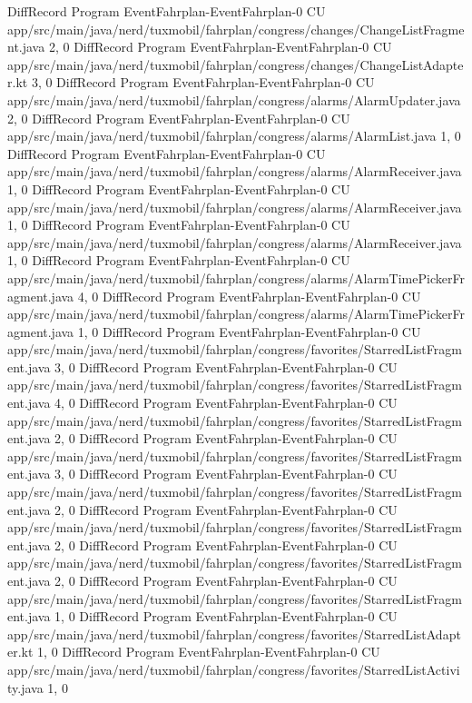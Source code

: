 DiffRecord Program EventFahrplan-EventFahrplan-0 CU app/src/main/java/nerd/tuxmobil/fahrplan/congress/changes/ChangeListFragment.java  {2, 0}
DiffRecord Program EventFahrplan-EventFahrplan-0 CU app/src/main/java/nerd/tuxmobil/fahrplan/congress/changes/ChangeListAdapter.kt  {3, 0}
DiffRecord Program EventFahrplan-EventFahrplan-0 CU app/src/main/java/nerd/tuxmobil/fahrplan/congress/alarms/AlarmUpdater.java  {2, 0}
DiffRecord Program EventFahrplan-EventFahrplan-0 CU app/src/main/java/nerd/tuxmobil/fahrplan/congress/alarms/AlarmList.java  {1, 0}
DiffRecord Program EventFahrplan-EventFahrplan-0 CU app/src/main/java/nerd/tuxmobil/fahrplan/congress/alarms/AlarmReceiver.java  {1, 0}
DiffRecord Program EventFahrplan-EventFahrplan-0 CU app/src/main/java/nerd/tuxmobil/fahrplan/congress/alarms/AlarmReceiver.java  {1, 0}
DiffRecord Program EventFahrplan-EventFahrplan-0 CU app/src/main/java/nerd/tuxmobil/fahrplan/congress/alarms/AlarmReceiver.java  {1, 0}
DiffRecord Program EventFahrplan-EventFahrplan-0 CU app/src/main/java/nerd/tuxmobil/fahrplan/congress/alarms/AlarmTimePickerFragment.java  {4, 0}
DiffRecord Program EventFahrplan-EventFahrplan-0 CU app/src/main/java/nerd/tuxmobil/fahrplan/congress/alarms/AlarmTimePickerFragment.java  {1, 0}
DiffRecord Program EventFahrplan-EventFahrplan-0 CU app/src/main/java/nerd/tuxmobil/fahrplan/congress/favorites/StarredListFragment.java  {3, 0}
DiffRecord Program EventFahrplan-EventFahrplan-0 CU app/src/main/java/nerd/tuxmobil/fahrplan/congress/favorites/StarredListFragment.java  {4, 0}
DiffRecord Program EventFahrplan-EventFahrplan-0 CU app/src/main/java/nerd/tuxmobil/fahrplan/congress/favorites/StarredListFragment.java  {2, 0}
DiffRecord Program EventFahrplan-EventFahrplan-0 CU app/src/main/java/nerd/tuxmobil/fahrplan/congress/favorites/StarredListFragment.java  {3, 0}
DiffRecord Program EventFahrplan-EventFahrplan-0 CU app/src/main/java/nerd/tuxmobil/fahrplan/congress/favorites/StarredListFragment.java  {2, 0}
DiffRecord Program EventFahrplan-EventFahrplan-0 CU app/src/main/java/nerd/tuxmobil/fahrplan/congress/favorites/StarredListFragment.java  {2, 0}
DiffRecord Program EventFahrplan-EventFahrplan-0 CU app/src/main/java/nerd/tuxmobil/fahrplan/congress/favorites/StarredListFragment.java  {2, 0}
DiffRecord Program EventFahrplan-EventFahrplan-0 CU app/src/main/java/nerd/tuxmobil/fahrplan/congress/favorites/StarredListFragment.java  {1, 0}
DiffRecord Program EventFahrplan-EventFahrplan-0 CU app/src/main/java/nerd/tuxmobil/fahrplan/congress/favorites/StarredListAdapter.kt  {1, 0}
DiffRecord Program EventFahrplan-EventFahrplan-0 CU app/src/main/java/nerd/tuxmobil/fahrplan/congress/favorites/StarredListActivity.java  {1, 0}
